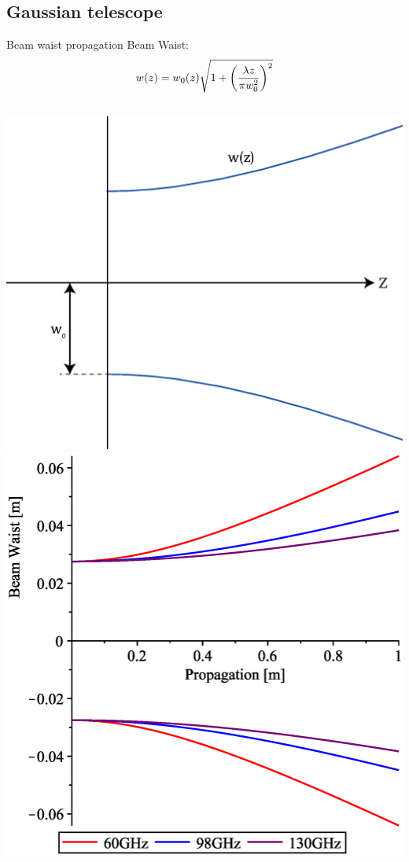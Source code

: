 \documentclass[hyperref={colorlinks=true,urlcolor=blue,linkcolor=.},aspectratio=1610,mathserif]{beamer}
\begin{document}
\subsection{Gaussian telescope}
\begin{frame}{Beam waist propagation}
	\centering
	Beam Waist:
	\begin{align}
		w(z) = w_0(z)\sqrt{1+\pqty{\frac{\lambda z}{\pi w_0^2}}^2}
	\end{align}
	\begin{columns}[c]
		\centering
		\includegraphics[width=.7\textwidth]{Figures/PropEx.eps}
		\centering
		\includegraphics[width=.7\textwidth]{Figures/BeamProp.eps}
	\end{columns}
\end{frame}
\end{document}
